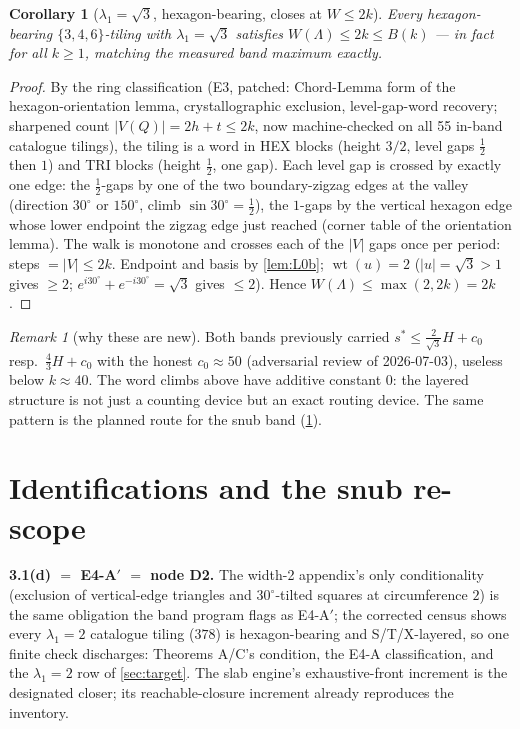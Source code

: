\documentclass[11pt,a4paper,oneside]{article}
\theoremstyle{plain}
\newtheorem{corollary}[theorem]{Corollary}
\theoremstyle{remark}
\newtheorem{remark}[theorem]{Remark}
\DeclareMathOperator{\wt}{wt}
\newcommand{\Bk}{B(k)}
\begin{document}
\begin{corollary}[$\lambda_1 = \sqrt3$, hexagon-bearing, closes at $W \le 2k$]\label{cor:C2}
Every hexagon-bearing $\{3,4,6\}$-tiling with $\lambda_1 = \sqrt3$ satisfies
$W(\Lambda) \le 2k \le \Bk$ --- in fact for all $k \ge 1$, matching the measured band
maximum exactly.
\end{corollary}

\begin{proof}
By the ring classification (E3, patched: Chord-Lemma form of the hexagon-orientation
lemma, crystallographic exclusion, level-gap-word recovery; sharpened count
$|V(Q)| = 2h + t \le 2k$, now machine-checked on all 55 in-band catalogue tilings), the
tiling is a word in HEX blocks (height $3/2$, level gaps $\tfrac12$ then $1$) and TRI
blocks (height $\tfrac12$, one gap). Each level gap is crossed by exactly one edge: the
$\tfrac12$-gaps by one of the two boundary-zigzag edges at the valley (direction
$30^\circ$ or $150^\circ$, climb $\sin 30^\circ = \tfrac12$), the $1$-gaps by the vertical
hexagon edge whose lower endpoint the zigzag edge just reached (corner table of the
orientation lemma). The walk is monotone and crosses each of the $|V|$ gaps once per
period: steps $= |V| \le 2k$. Endpoint and basis by \cref{lem:L0b};
$\wt(u) = 2$ ($|u| = \sqrt3 > 1$ gives $\ge 2$; $e^{i30^\circ} + e^{-i30^\circ} = \sqrt3$
gives $\le 2$). Hence $W(\Lambda) \le \max(2, 2k) = 2k$.
\end{proof}

\begin{remark}[why these are new]
Both bands previously carried $s^* \le \frac{2}{\sqrt3}H + c_0$ resp.\ $\frac43 H + c_0$
with the honest $c_0 \approx 50$ (adversarial review of 2026-07-03), useless below
$k \approx 40$. The word climbs above have additive constant $0$: the layered structure
is not just a counting device but an exact routing device. The same pattern is the planned
route for the snub band (\cref{sec:ident}).
\end{remark}

\section{Identifications and the snub re-scope}\label{sec:ident}

\textbf{3.1(d) $=$ E4-A$'$ $=$ node D2.} The width-2 appendix's only conditionality
(exclusion of vertical-edge triangles and $30^\circ$-tilted squares at circumference $2$)
is the same obligation the band program flags as E4-A$'$; the corrected census shows every
$\lambda_1 = 2$ catalogue tiling ($378$) is hexagon-bearing and S/T/X-layered, so one
finite check discharges: Theorems A/C's condition, the E4-A classification, and the
$\lambda_1 = 2$ row of \cref{sec:target}. The slab engine's exhaustive-front increment is
the designated closer; its reachable-closure increment already reproduces the inventory.
\end{document}
